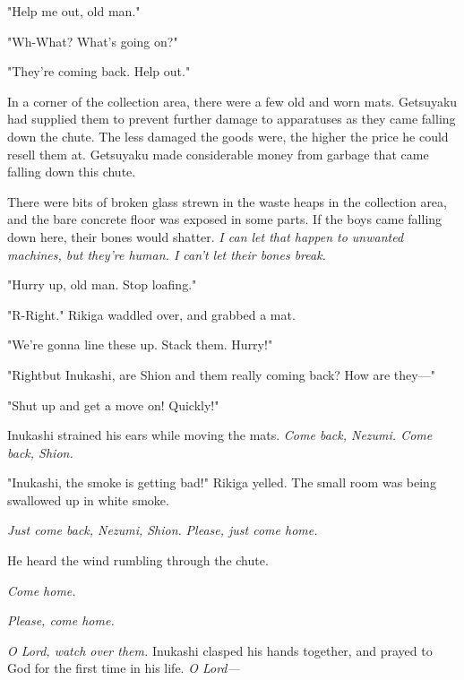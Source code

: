 "Help me out, old man."

"Wh-What? What's going on?"

"They're coming back. Help out."

In a corner of the collection area, there were a few old and worn mats.
Getsuyaku had supplied them to prevent further damage to apparatuses as
they came falling down the chute. The less damaged the goods were, the
higher the price he could resell them at. Getsuyaku made considerable
money from garbage that came falling down this chute.

There were bits of broken glass strewn in the waste heaps in the
collection area, and the bare concrete floor was exposed in some parts.
If the boys came falling down here, their bones would shatter. \emph{I can let
that happen to unwanted machines, but they're human. I can't let their
bones break.}

"Hurry up, old man. Stop loafing."

"R-Right." Rikiga waddled over, and grabbed a mat.

"We're gonna line these up. Stack them. Hurry!"

"Right\el but Inukashi, are Shion and them really coming back? How are
they---"

"Shut up and get a move on! Quickly!"

Inukashi strained his ears while moving the mats. \emph{Come back, Nezumi.
Come back, Shion.}

"Inukashi, the smoke is getting bad!" Rikiga yelled. The small room was
being swallowed up in white smoke.

\emph{Just come back, Nezumi, Shion.}
\emph{Please, just come home.}

He heard the wind rumbling through the chute.

\emph{Come home.}

\emph{Please, come home.}

\emph{O Lord, watch over them.} Inukashi clasped his hands together, and prayed
to God for the first time in his life. \emph{O Lord---}